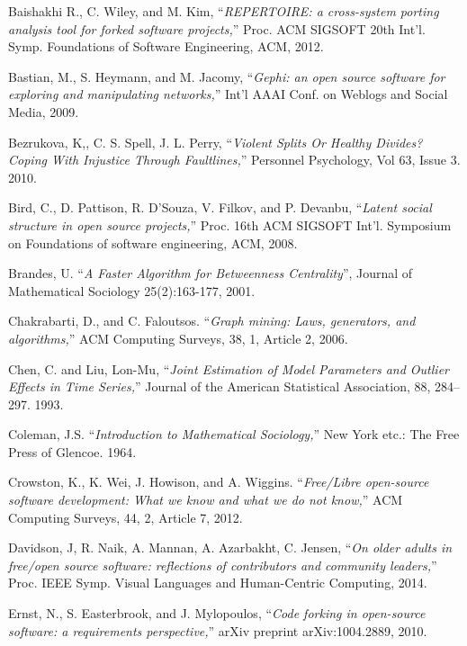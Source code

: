 \begin{thebibliography}{99.}
 Baishakhi R., C. Wiley, and M. Kim, ``\textit{REPERTOIRE: a cross-system porting analysis tool for forked software projects,}'' Proc. ACM SIGSOFT 20th Int'l. Symp. Foundations of Software Engineering, ACM, 2012.

 Bastian, M., S. Heymann, and M. Jacomy, ``\textit{Gephi: an open source software for exploring and manipulating networks,}'' Int'l AAAI Conf. on Weblogs and Social Media, 2009.

 Bezrukova, K,, C. S. Spell, J. L. Perry, ``\textit{Violent Splits Or Healthy Divides? Coping With Injustice Through Faultlines,}'' Personnel Psychology, Vol 63, Issue 3. 2010. 

 Bird, C., D. Pattison, R. D'Souza, V. Filkov, and P. Devanbu, ``\textit{Latent social structure in open source projects,}'' Proc. 16th ACM SIGSOFT Int'l. Symposium on Foundations of software engineering, ACM, 2008.  

 Brandes, U. ``\textit{A Faster Algorithm for Betweenness Centrality}'', Journal of Mathematical Sociology 25(2):163-177, 2001.

 Chakrabarti,  D., and C. Faloutsos. ``\textit{Graph mining: Laws, generators, and algorithms,}'' ACM Computing Surveys, 38, 1, Article 2, 2006.

 Chen, C. and Liu, Lon-Mu, ``\textit{Joint Estimation of Model Parameters and Outlier Effects in Time Series,}'' Journal of the American Statistical Association, 88, 284--297. 1993.

 Coleman, J.S. ``\textit{Introduction to Mathematical Sociology,}'' New York etc.: The Free Press of Glencoe. 1964.

Crowston, K., K. Wei, J. Howison, and A. Wiggins. ``\textit{Free/Libre open-source software development: What we know and what we do not know,}'' ACM Computing Surveys, 44, 2, Article 7, 2012.

 Davidson, J, R. Naik, A. Mannan, A. Azarbakht, C. Jensen, ``\textit{On older adults in free/open source software: reflections of contributors and community leaders,}'' Proc. IEEE Symp. Visual Languages and Human-Centric Computing, 2014.

 Ernst, N., S. Easterbrook, and J. Mylopoulos, ``\textit{Code forking in open-source software: a requirements perspective,}'' arXiv preprint arXiv:1004.2889, 2010.


\end{thebibliography}
